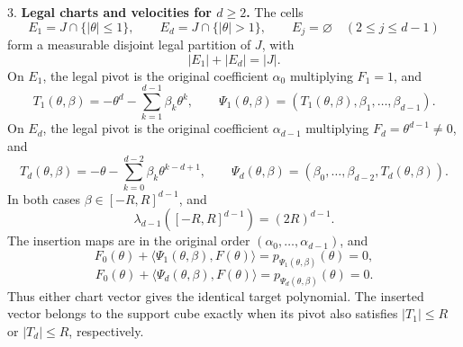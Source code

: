 \begin{proposition}
3. \textbf{Legal charts and velocities for \(d\geq2\).} The cells
\begin{equation}
\label{eq:appendix-indented-016}
   E_1=J\cap\{\lvert\theta\rvert\leq1\},
   \qquad
   E_d=J\cap\{\lvert\theta\rvert>1\},
   \qquad
   E_j=\varnothing\quad(2\leq j\leq d-1)
\end{equation}
   form a measurable disjoint legal partition of \(J\), with
\begin{equation}
\label{eq:appendix-indented-017}
   \lvert E_1\rvert+\lvert E_d\rvert=\lvert J\rvert.
\end{equation}
   On \(E_1\), the legal pivot is the original coefficient \(\alpha_0\) multiplying \(F_1=1\), and
\begin{equation}
\label{eq:appendix-indented-018}
   T_1(\theta,\beta)
   =-\theta^d-\sum_{k=1}^{d-1}\beta_k\theta^k,
   \qquad
   \Psi_1(\theta,\beta)
   =(T_1(\theta,\beta),\beta_1,\ldots,\beta_{d-1}).
\end{equation}
   On \(E_d\), the legal pivot is the original coefficient \(\alpha_{d-1}\) multiplying \(F_d=\theta^{d-1}\neq0\), and
\begin{equation}
\label{eq:appendix-indented-019}
   T_d(\theta,\beta)
   =-\theta-\sum_{k=0}^{d-2}\beta_k\theta^{k-d+1},
   \qquad
   \Psi_d(\theta,\beta)
   =(\beta_0,\ldots,\beta_{d-2},T_d(\theta,\beta)).
\end{equation}
   In both cases \(\beta\in[-R,R]^{d-1}\), and
\begin{equation}
\label{eq:appendix-indented-020}
   \lambda_{d-1}([-R,R]^{d-1})=(2R)^{d-1}.
\end{equation}
   The insertion maps are in the original order \((\alpha_0,\ldots,\alpha_{d-1})\), and
\begin{equation}
\label{eq:appendix-indented-021}
   F_0(\theta)+\langle\Psi_1(\theta,\beta),F(\theta)\rangle
   =p_{\Psi_1(\theta,\beta)}(\theta)=0,
\end{equation}
\begin{equation}
\label{eq:appendix-indented-022}
   F_0(\theta)+\langle\Psi_d(\theta,\beta),F(\theta)\rangle
   =p_{\Psi_d(\theta,\beta)}(\theta)=0.
\end{equation}
   Thus either chart vector gives the identical target polynomial. The inserted vector belongs to the support cube exactly when its pivot also satisfies \(\lvert T_1\rvert\leq R\) or \(\lvert T_d\rvert\leq R\), respectively.


\end{proposition}
